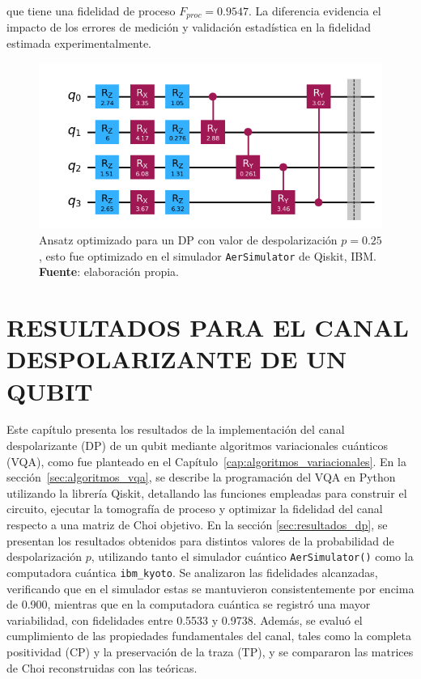 \documentclass[letterpaper,12pt]{thesisECFM}
\theoremstyle{plain}
\theoremstyle{definition}
\theoremstyle{definition}
\theoremstyle{remark}
\newcommand{\1}{\mathbb{1}}
\begin{document}
que tiene una fidelidad de proceso $F_{proc} = 0.9547$. La diferencia evidencia el impacto de los errores de medición y validación estadística en la fidelidad estimada experimentalmente.
\begin{figure}[h!] 
    \centering 
    \includegraphics[width=0.70\linewidth]{imagenes/ansatz_p025_v2.png}
    \caption{Ansatz optimizado para un DP con valor de despolarización $p=0.25$, esto fue optimizado en el simulador \texttt{AerSimulator} de Qiskit, IBM. \textbf{Fuente}: elaboración propia. }
    \label{fig:ansatz_p025}
    \end{figure}

\chapter{RESULTADOS PARA EL CANAL DESPOLARIZANTE DE UN QUBIT } \label{cap:resultados} %
Este capítulo presenta los resultados de la implementación del canal
despolarizante (DP) de un qubit mediante algoritmos variacionales cuánticos
(VQA), como fue planteado en el Capítulo~\ref{cap:algoritmos_variacionales}. En
la sección~\ref{sec:algoritmos_vqa}, se describe la programación del VQA en
Python utilizando la librería Qiskit, detallando las funciones empleadas para
construir el circuito, ejecutar la tomografía de proceso y optimizar la
fidelidad del canal respecto a una matriz de Choi objetivo.  En la sección
\ref{sec:resultados_dp}, se presentan los resultados obtenidos para distintos
valores de la probabilidad de despolarización $p$, utilizando tanto el
simulador cuántico \texttt{AerSimulator()} como la computadora cuántica
\texttt{ibm\_kyoto}. Se analizaron las
fidelidades alcanzadas, verificando que en el simulador estas se mantuvieron
consistentemente por encima de 0.900, mientras que en la computadora cuántica
se registró una mayor variabilidad, con fidelidades entre 0.5533 y 0.9738.
Además, se evaluó el cumplimiento de
las propiedades fundamentales del canal, tales como la completa positividad
(CP) y la preservación de la traza (TP), y se compararon las matrices de Choi
reconstruidas con las teóricas.
\end{document}
